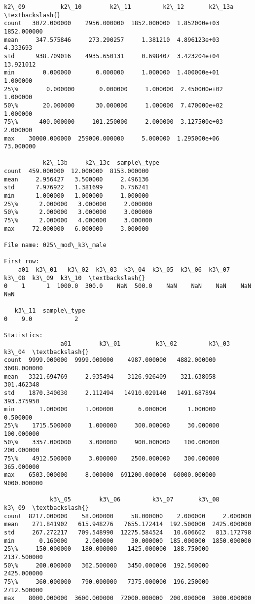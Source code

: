 \documentclass[11pt]{article}
\begin{document}
\begin{Verbatim}[commandchars=\\\{\}]
              k2\_09          k2\_10        k2\_11         k2\_12       k2\_13a  \textbackslash{}
count   3072.000000    2956.000000  1852.000000  1.852000e+03  1852.000000   
mean     347.575846     273.290257     1.381210  4.896123e+03     4.333693   
std      938.709016    4935.650131     0.698407  3.423204e+04    13.921012   
min        0.000000       0.000000     1.000000  1.400000e+01     1.000000   
25\%        0.000000       0.000000     1.000000  2.450000e+02     1.000000   
50\%       20.000000      30.000000     1.000000  7.470000e+02     1.000000   
75\%      400.000000     101.250000     2.000000  3.127500e+03     2.000000   
max    30000.000000  259000.000000     5.000000  1.295000e+06    73.000000   

           k2\_13b     k2\_13c  sample\_type  
count  459.000000  12.000000  8153.000000  
mean     2.956427   3.500000     2.496136  
std      7.976922   1.381699     0.756241  
min      1.000000   1.000000     1.000000  
25\%      2.000000   3.000000     2.000000  
50\%      2.000000   3.000000     3.000000  
75\%      2.000000   4.000000     3.000000  
max     72.000000   6.000000     3.000000  

File name: 025\_mod\_k3\_male

First row: 
    a01  k3\_01   k3\_02  k3\_03  k3\_04  k3\_05  k3\_06  k3\_07  k3\_08  k3\_09  k3\_10  \textbackslash{}
0    1      1  1000.0  300.0    NaN  500.0    NaN    NaN    NaN    NaN    NaN   

   k3\_11  sample\_type  
0    9.0            2  

Statistics: 
                a01        k3\_01          k3\_02         k3\_03        k3\_04  \textbackslash{}
count  9999.000000  9999.000000    4987.000000   4882.000000  3608.000000   
mean   3321.694769     2.935494    3126.926409    321.638058   301.462348   
std    1870.340030     2.112494   14910.029140   1491.687894   393.375950   
min       1.000000     1.000000       6.000000      1.000000     0.500000   
25\%    1715.500000     1.000000     300.000000     30.000000   100.000000   
50\%    3357.000000     3.000000     900.000000    100.000000   200.000000   
75\%    4912.500000     3.000000    2500.000000    300.000000   365.000000   
max    6503.000000     8.000000  691200.000000  60000.000000  9000.000000   

             k3\_05        k3\_06         k3\_07       k3\_08        k3\_09  \textbackslash{}
count  8217.000000    58.000000     58.000000    2.000000     2.000000   
mean    271.841902   615.948276   7655.172414  192.500000  2425.000000   
std     267.272217   709.548990  12275.584524   10.606602   813.172798   
min       0.160000     2.000000     30.000000  185.000000  1850.000000   
25\%     150.000000   180.000000   1425.000000  188.750000  2137.500000   
50\%     200.000000   362.500000   3450.000000  192.500000  2425.000000   
75\%     360.000000   790.000000   7375.000000  196.250000  2712.500000   
max    8000.000000  3600.000000  72000.000000  200.000000  3000.000000   


\end{Verbatim}
\end{document}
